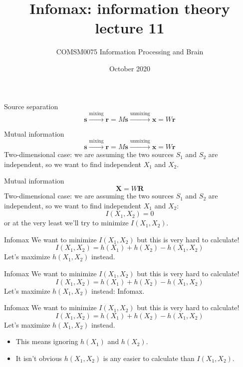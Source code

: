 \documentclass{beamer}
\title[Information Theory lecture 11]{Infomax: information theory lecture 11}
\author{COMSM0075 Information Processing and Brain}
\institute{\texttt{comsm0075.github.io}}
\date{October 2020}
\newcommand{\crish}{\color{reddish}}
\newcommand{\cbla}{\color{black}}
\newcommand{\cred}{\color{red}}
\newcommand{\cblu}{\color{blue}}
\begin{document}
\maketitle

\begin{frame}{Source separation}
  \cred
  $$
 \mathbf{ s}\stackrel{\mbox{mixing}}{\longrightarrow}\mathbf{r}=M\mathbf{ s}\stackrel{\mbox{unmixing}}{\longrightarrow}\mathbf{ x}=W\mathbf{r}
 $$
 \cbla
\end{frame}

\begin{frame}{Mutual information}
    \cred
  $$
 \mathbf{ s}\stackrel{\mbox{mixing}}{\longrightarrow}\mathbf{r}=M\mathbf{ s}\stackrel{\mbox{unmixing}}{\longrightarrow}\mathbf{ x}=W\mathbf{r}
 $$
 \cbla
  Two-dimensional case: we are assuming the two sources \crish$S_1$\cbla{} and \crish$S_2$\cbla{} are independent, so we want to find independent \crish$X_1$\cbla{} and \crish$X_2$\cbla.
\end{frame}

\begin{frame}{Mutual information}
  \crish $$\textbf{X}=W\textbf{R}$$\cbla
  Two-dimensional case: we are assuming the two sources \crish$S_1$\cbla{} and \crish$S_2$\cbla{} are independent, so we want to find independent \crish$X_1$\cbla{} and \crish$X_2$\cbla:
  \crish
  $$
  I(X_1,X_2)=0
  $$
  \cbla
  or at the very least we'll try to minimize \cblu$I(X_1,X_2)$\cbla{}.
\end{frame}


\begin{frame}{Infomax}
  We want to minimize \cblu$I(X_1,X_2)$\cbla{} but this is very hard to calculate!
  \crish
  $$
  I(X_1,X_2)=h(X_1)+h(X_2)-h(X_1,X_2)
  $$
  \cbla
  Let's maximize \crish$h(X_1,X_2)$\cbla{} instead.
  
\end{frame}


\begin{frame}{Infomax}
  We want to minimize $I(X_1,X_2)$\cbla{} but this is very hard to calculate!
  \crish
  $$
  I(X_1,X_2)=h(X_1)+h(X_2)-h(X_1,X_2)
  $$
  \cbla
  Let's \cblu{}maximize $h(X_1,X_2)$\cbla{} instead: \cblu{}Infomax\cbla{}.
  \end{frame}



\begin{frame}{Infomax}
  We want to minimize $I(X_1,X_2)$\cbla{} but this is very hard to calculate!
  \crish
  $$
  I(X_1,X_2)=h(X_1)+h(X_2)-h(X_1,X_2)
  $$
  \cbla
  Let's maximize \crish$h(X_1,X_2)$\cbla{} instead.
  \begin{itemize}
  \item This means ignoring \crish$h(X_1)$\cbla{} and \crish$h(X_2)$\cbla{}.
  \item It isn't obvious \crish$h(X_1,X_2)$\cbla{} is any easier to calculate than \crish$I(X_1,X_2)$\cbla{}.
  \end{itemize}
\end{frame}
\end{document}
